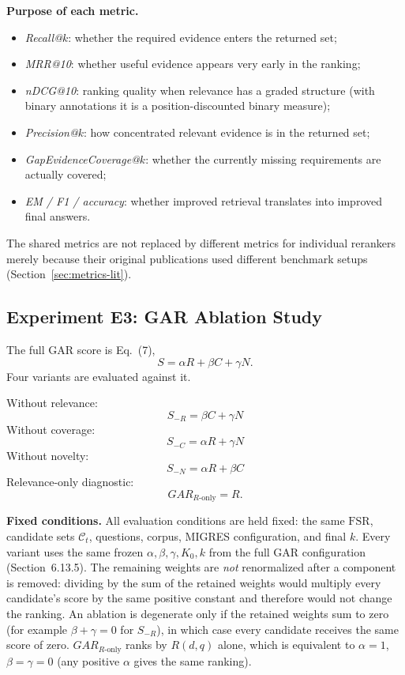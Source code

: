 \documentclass[11pt,a4paper]{article}
\begin{document}
\textbf{Purpose of each metric.}
\begin{itemize}[leftmargin=1.5em]
\item \emph{Recall@$k$}: whether the required evidence enters the returned set;
\item \emph{MRR@10}: whether useful evidence appears very early in the ranking;
\item \emph{nDCG@10}: ranking quality when relevance has a graded structure (with binary annotations it is a position-discounted binary measure);
\item \emph{Precision@$k$}: how concentrated relevant evidence is in the returned set;
\item \emph{GapEvidenceCoverage@$k$}: whether the currently missing requirements are actually covered;
\item \emph{EM / F1 / accuracy}: whether improved retrieval translates into improved final answers.
\end{itemize}

The shared metrics are not replaced by different metrics for individual rerankers merely because their original publications used different benchmark setups (Section~\ref{sec:metrics-lit}).

\subsection{Experiment E3: GAR Ablation Study}
\label{sec:e3}

The full GAR score is Eq.~(7),
\[
\boxed{S=\alpha R+\beta C+\gamma N.}
\]
Four variants are evaluated against it.

Without relevance:
\[
\boxed{S_{-R}=\beta C+\gamma N}
\]
Without coverage:
\[
\boxed{S_{-C}=\alpha R+\gamma N}
\]
Without novelty:
\[
\boxed{S_{-N}=\alpha R+\beta C}
\]
Relevance-only diagnostic:
\[
\boxed{GAR_{R\text{-only}}=R.}
\]

\textbf{Fixed conditions.} All evaluation conditions are held fixed: the same $\mathrm{FSR}$, candidate sets $\mathcal{C}_t$, questions, corpus, MIGRES configuration, and final $k$. Every variant uses the same frozen $\alpha,\beta,\gamma,K_0,k$ from the full GAR configuration (Section~6.13.5). The remaining weights are \emph{not} renormalized after a component is removed: dividing by the sum of the retained weights would multiply every candidate's score by the same positive constant and therefore would not change the ranking. An ablation is degenerate only if the retained weights sum to zero (for example $\beta+\gamma=0$ for $S_{-R}$), in which case every candidate receives the same score of zero. $GAR_{R\text{-only}}$ ranks by $R(d,q)$ alone, which is equivalent to $\alpha=1$, $\beta=\gamma=0$ (any positive $\alpha$ gives the same ranking).
\end{document}
